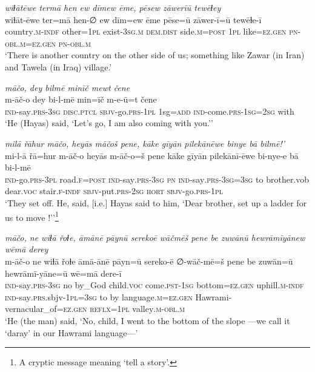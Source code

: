 \ea \label{ŽH.6}
\textit{wiɫātēwe termā hen ew dīmew ēme, pēsew zāwerīū tewēɫey} \\ 
\gll wiɫāt-ēwe ter=mā hen-∅ ew dīm=ew ēme pēse=ū zāwer-ī=ū tewēɫe-ī \\ 
 country\textsc{.m}\textsc{-indf} other\textsc{=1pl} exist\textsc{-3sg}\textsc{.m} \textsc{dem.dist} side\textsc{.m}\textsc{=\textsc{post}} \textsc{1pl} like\textsc{=ez}\textsc{.gen} \textsc{pn}\textsc{-obl}\textsc{.m}\textsc{=ez}\textsc{.gen} \textsc{pn}\textsc{-obl}\textsc{.m} \\ 
\glt `There is another country on the other side of us; something like Zawar (in Iran) and Tawela (in Iraq) village.'
\z 
 
\ea \label{ŽH.11}
\textit{māčo, dey bilmē minīč mewt čene} \\ 
\gll m-āč-o dey bi-l-mē min=īč m-e-ū=t čene \\ 
 \textsc{ind-}say\textsc{.prs}\textsc{-3sg} \textsc{disc.ptcl} \textsc{sbjv-}go\textsc{.prs}\textsc{-1pl} 1sg\textsc{=add} \textsc{ind-}come\textsc{.prs}\textsc{-1sg}\textsc{=\textsc{2sg}} with \\ 
\glt `He (Hayas) said, ‘Let’s go, I am also coming with you.’'
\z 
 
\ea \label{ŽH.12}
\textit{milā řāhur māčo, heyās māčoš pene, kāke gīyān pilekānēwe binye bā bilmē!’} \\ 
\gll mi-l-ā řā=hur m-āč-o heyās m-āč-o=š pene kāke gīyān pilekānī-ēwe bi-nye-e bā bi-l-mē \\ 
 \textsc{ind-}go\textsc{.prs}\textsc{-3pl} road\textsc{\textsc{.f}}\textsc{=\textsc{post}} \textsc{ind-}say\textsc{.prs}\textsc{-3sg} \textsc{pn} \textsc{ind-}say\textsc{.prs}\textsc{-3sg}\textsc{=3sg} to brother.vob dear.\textsc{voc} stair\textsc{\textsc{.f}}\textsc{-indf} \textsc{sbjv-}put\textsc{.prs}-\textsc{2sg} \textsc{hort} \textsc{sbjv-}go\textsc{.prs}\textsc{-1pl} \\ 
\glt `They set off. He, said, [i.e.] Hayas said to him, ‘Dear brother, set up a ladder for us to move !’'\footnote{A cryptic message meaning ‘tell a story’.}
\z 
 
\ea \label{ŽH.23}
\textit{māčo, ne wiɫā řoɫe, āmānē pāynū serekoē wāčmēš pene be zuwānū hewrāmīyānew wēmā derey} \\ 
\gll m-āč-o ne wiɫā řoɫe āmā-ānē pāyn=ū sereko-ē ∅-wāč-mē=š pene be zuwān=ū hewrāmī-yāne=ū wē=mā dere-ī \\ 
 \textsc{ind-}say\textsc{.prs}\textsc{-3sg} no by\_God child.\textsc{voc} come\textsc{.pst}\textsc{-1sg} bottom\textsc{=ez}\textsc{.gen} uphill\textsc{.m}\textsc{-indf} \textsc{ind-}say\textsc{.prs}.sbjv\textsc{-1pl}\textsc{=3sg} to by language\textsc{.m}\textsc{=ez}\textsc{.gen} Hawrami-vernacular\_of\textsc{=ez}\textsc{.gen} \textsc{reflx}\textsc{=1pl} valley\textsc{.m}\textsc{-obl}\textsc{.m} \\ 
\glt `He (the man) said, ‘No, child, I went to the bottom of the slope —we call it ‘daray’ in our Hawrami language—'
\z 
 
